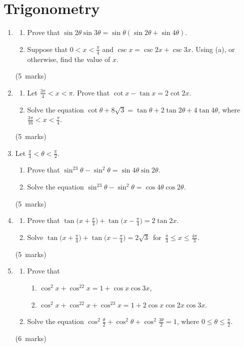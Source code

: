 \documentclass[12pt, a4paper]{article} %
\newcommand{\qmarks}[1]{\leavevmode\unskip\hspace*{\fill}\mbox{(#1 marks)}}
\begin{document}
\section{Trigonometry}
\begin{enumerate}
    \item
    \begin{enumerate}
        \item Prove that \(\sin 2\theta \sin 3\theta=\sin\theta(\sin2\theta+\sin4\theta)\).
        \item Suppose that \(\displaystyle 0<x<\frac{\pi}{4}\) and \(\csc x=\csc 2x+\csc 3x\). Using (a), or otherwise, find the value of \(x\).
    \end{enumerate} \qmarks{5}

    \item \begin{enumerate}
        \item Let \(\displaystyle \frac{3\pi}{4}<x<\pi\). Prove that \(\cot x-\tan x=2\cot 2x\).
        \item Solve the equation \(\cot \theta + 8\sqrt{3} = \tan \theta+2\tan 2\theta+4\tan 4\theta\), where \(\displaystyle \frac{3\pi}{16}<x<\frac{\pi}{4}\).
    \end{enumerate} \qmarks{5}

    \item Let \(\displaystyle \frac{\pi}{4}<\theta<\frac{\pi}{2}\).
    \begin{enumerate}
        \item Prove that \(\sin^23\theta-\sin^2\theta=\sin4\theta\sin2\theta\).
        \item Solve the equation \(\sin^23\theta-\sin^2\theta=\cos4\theta\cos2\theta\).
    \end{enumerate}\qmarks{5}

    \item \begin{enumerate}
        \item Prove that \(\displaystyle \tan\bigg(x+\frac{\pi}{4}\bigg)+\tan\bigg(x-\frac{\pi}{4}\bigg)=2\tan 2x\).
        \item Solve \(\displaystyle \tan\bigg(x+\frac{\pi}{4}\bigg)+\tan\bigg(x-\frac{\pi}{4}\bigg)=2\sqrt{3}\) \,for\, \(\displaystyle \frac{\pi}{3}\leq x \leq \frac{4\pi}{3}\).
    \end{enumerate}\qmarks{5}

    \item \begin{enumerate}
        \item Prove that
            \begin{enumerate}[label=(\roman*)]
                \item \(\cos^2x+\cos^22x=1+\cos x\cos 3x\),
                \item \(\cos^2x+\cos^22x+\cos^23x=1+2\cos x\cos2x\cos3x\).
            \end{enumerate}
        \item Solve the equation \(\displaystyle \cos^2\frac{\theta}{2}+\cos^2\theta+\cos^2\frac{3\theta}{2}=1\), where \(\displaystyle 0 \leq \theta \leq \frac{\pi}{2}\).
    \end{enumerate} \qmarks{6}

    
\end{enumerate}
\end{document}
